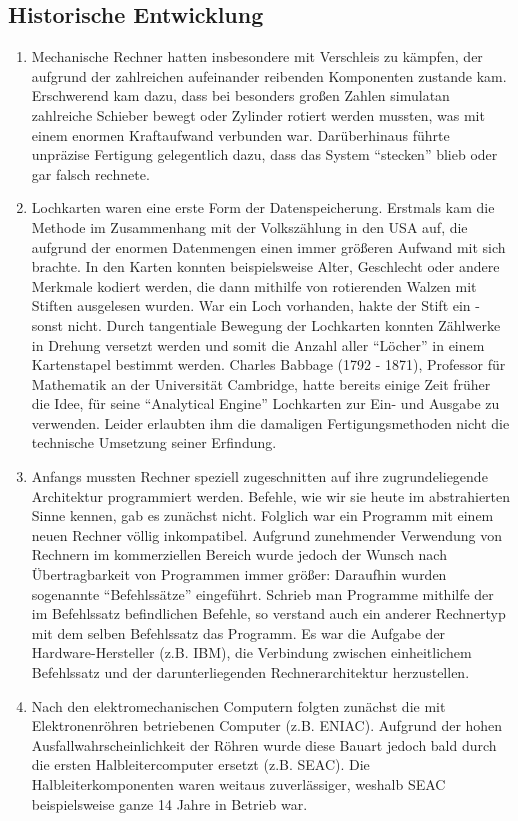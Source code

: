 \documentclass{article}
\begin{document}
    \subsection*{Historische Entwicklung}
    \begin{enumerate}
        \item Mechanische Rechner hatten insbesondere mit Verschleis zu kämpfen, der aufgrund der zahlreichen aufeinander reibenden Komponenten zustande kam. Erschwerend kam dazu, dass bei besonders großen Zahlen simulatan zahlreiche Schieber bewegt oder Zylinder rotiert werden mussten, was mit einem enormen Kraftaufwand verbunden war. Darüberhinaus führte unpräzise Fertigung gelegentlich dazu, dass das System "`stecken"' blieb oder gar falsch rechnete.
        \item Lochkarten waren eine erste Form der Datenspeicherung. Erstmals kam die Methode im Zusammenhang mit der Volkszählung in den USA auf, die aufgrund der enormen Datenmengen einen immer größeren Aufwand mit sich brachte. In den Karten konnten beispielsweise Alter, Geschlecht oder andere Merkmale kodiert werden, die dann mithilfe von rotierenden Walzen mit Stiften ausgelesen wurden. War ein Loch vorhanden, hakte der Stift ein - sonst nicht. Durch tangentiale Bewegung der Lochkarten konnten Zählwerke in Drehung versetzt werden und somit die Anzahl aller "`Löcher"' in einem Kartenstapel bestimmt werden. Charles Babbage (1792 - 1871), Professor für Mathematik an der Universität Cambridge, hatte bereits einige Zeit früher die Idee, für seine "`Analytical Engine"' Lochkarten zur Ein- und Ausgabe zu verwenden. Leider erlaubten ihm die damaligen Fertigungsmethoden nicht die technische Umsetzung seiner Erfindung. 
        \item Anfangs mussten Rechner speziell zugeschnitten auf ihre zugrundeliegende Architektur programmiert werden. Befehle, wie wir sie heute im abstrahierten Sinne kennen, gab es zunächst nicht. Folglich war ein Programm mit einem neuen Rechner völlig inkompatibel. Aufgrund zunehmender Verwendung von Rechnern im kommerziellen Bereich wurde jedoch der Wunsch nach Übertragbarkeit von Programmen immer größer: Daraufhin wurden sogenannte "`Befehlssätze"' eingeführt. Schrieb man Programme mithilfe der im Befehlssatz befindlichen Befehle, so verstand auch ein anderer Rechnertyp mit dem selben Befehlssatz das Programm. Es war die Aufgabe der Hardware-Hersteller (z.B. IBM), die Verbindung zwischen einheitlichem Befehlssatz und der darunterliegenden Rechnerarchitektur herzustellen. 
        \item Nach den elektromechanischen Computern folgten zunächst die mit Elektronenröhren betriebenen Computer (z.B. ENIAC). Aufgrund der hohen Ausfallwahrscheinlichkeit der Röhren wurde diese Bauart jedoch bald durch die ersten Halbleitercomputer ersetzt (z.B. SEAC). Die Halbleiterkomponenten waren weitaus zuverlässiger, weshalb SEAC beispielsweise ganze 14 Jahre in Betrieb war. 

\end{enumerate}
\end{document}
